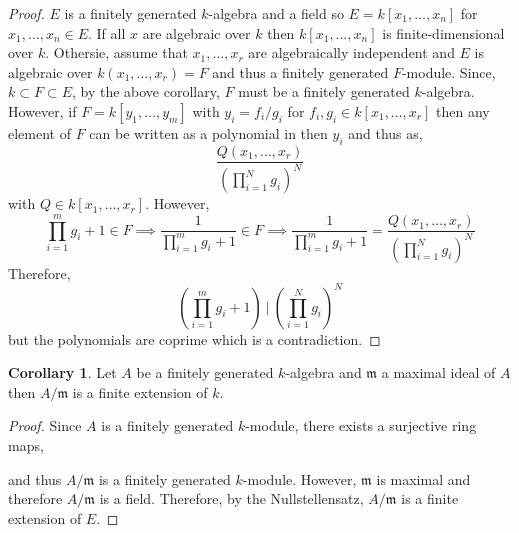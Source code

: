 \documentclass[12pt]{article}
\newcommand{\m}{\mathfrak{m}}
\theoremstyle{remark}
\theoremstyle{definition}
\newtheorem{corollary}[theorem]{Corollary}
\begin{document}
\begin{proof}
$E$ is a finitely generated $k$-algebra and a field so $E = k[x_1, \dots, x_n]$ for $x_1, \dots, x_n \in E$. If all $x$ are algebraic over $k$ then $k[x_1, \dots, x_n]$ is finite-dimensional over $k$. Othersie, assume that $x_1, \dots, x_r$ are algebraically independent and $E$ is algebraic over $k(x_1, \dots, x_r) = F$ and thus a finitely generated $F$-module. Since, $k \subset F \subset E$, by the above corollary, $F$ must be a finitely generated $k$-algebra. However, if $F = k[y_1, \dots, y_m]$ with $y_i = f_i / g_i$ for $f_i, g_i \in k[x_1, \dots, x_r]$ then any element of $F$ can be written as a polynomial in then $y_i$ and thus as,
\[ \frac{Q(x_1, \dots, x_r)}{\left( \prod_{i = 1}^N g_i \right)^N} \]
with $Q \in k[x_1, \dots, x_r]$. However,
\[ \prod\limits_{i = 1}^m g_i + 1 \in F \implies \frac{1}{\prod\limits_{i = 1}^m g_i + 1} \in F \implies \frac{1}{\prod\limits_{i = 1}^m g_i + 1} = \frac{Q(x_1, \dots, x_r)}{\left( \prod_{i = 1}^N g_i \right)^N}\]
Therefore, 
\[ \left(\prod_{i = 1}^m g_i + 1 \right) \: \bigg| \: \left( \prod_{i = 1}^N g_i \right)^N \]
but the polynomials are coprime which is a contradiction. 
\end{proof}

\begin{corollary}
Let $A$ be a finitely generated $k$-algebra and $\m$ a maximal ideal of $A$ then $A / \m$ is a finite extension of $k$. 
\end{corollary}

\begin{proof}
Since $A$ is a finitely generated $k$-module, there exists a surjective ring maps,
\begin{center}
\end{center}
and thus $A / \m$ is a finitely generated $k$-module. However, $\m$ is maximal and therefore $A / \m$ is a field. Therefore, by the Nullstellensatz, $A / \m$ is a finite extension of $E$.
\end{proof}
\end{document}
